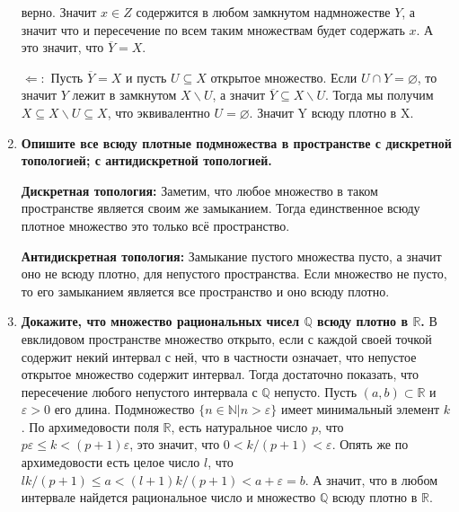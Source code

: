 \documentclass{article}
\begin{document}
\begin{enumerate}
        верно. Значит $x\in Z$ содержится в любом замкнутом надмножестве $Y$, а
        значит что и пересечение по всем таким множествам будет содержать $x$.
        А это значит, что $\overline{Y}=X$.\par
        $\Leftarrow:$ Пусть $\overline{Y}=X$ и пусть $U\subseteq X$ открытое
        множество. Если $U\cap Y=\varnothing$, то значит $Y$ лежит в замкнутом
        $X\backslash U$, а значит $\overline{Y} \subseteq X\backslash U$. Тогда
        мы получим $X\subseteq X\backslash U\subseteq X$, что эквивалентно
        $U=\varnothing$. Значит Y всюду плотно в X.
    \item \textbf{Опишите все всюду плотные подмножества в пространстве с
        дискретной топологией; с антидискретной топологией.}\par
        \textbf{Дискретная топология:} Заметим, что любое множество в таком
        пространстве является своим же замыканием. Тогда единственное всюду
        плотное множество это только всё пространство.\par
        \textbf{Антидискретная топология:} Замыкание пустого множества пусто, а
        значит оно не всюду плотно, для непустого пространства. Если множество
        не пусто, то его замыканием является все пространство и оно всюду плотно.
    \item \textbf{Докажите, что множество рациональных чисел $\mathbb{Q}$ всюду
        плотно в $\mathbb{R}$.} В евклидовом пространстве множество открыто,
        если с каждой своей точкой содержит некий интервал с ней, что в
        частности означает, что непустое открытое множество содержит интервал.
        Тогда достаточно показать, что пересечение любого непустого интервала с
        $\mathbb{Q}$ непусто. Пусть $(a, b)\subset\mathbb{R}$ и $\varepsilon>0$
        его длина. Подмножество $\{n\in\mathbb{N}|n>\varepsilon\}$ имеет
        минимальный элемент $k$. По архимедовости поля $\mathbb{R}$, есть
        натуральное число $p$, что $p\varepsilon \leqslant k < (p+1)
        \varepsilon$, это значит, что $0 < k/(p+1) < \varepsilon$. Опять же по
        архимедовости есть целое число $l$, что $lk/(p+1) \leqslant a <
        (l+1)k/(p+1) < a + \varepsilon = b$. А значит, что в любом интервале
        найдется рациональное число и множество $\mathbb{Q}$ всюду плотно в
        $\mathbb{R}$.
\end{enumerate}
\end{document}
